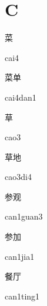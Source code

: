 ﻿%
\section*{C}
\begin{multicols*}{2}

\begin{verbete}[cai4]{菜}
\begin{pronuncia}{cai4}
\end{pronuncia}
\end{verbete}

\begin{verbete}{菜单}
\begin{pronuncia}{cai4dan1}
\end{pronuncia}
\end{verbete}

\begin{verbete}[cao3]{草}
\begin{pronuncia}{cao3}
\end{pronuncia}
\end{verbete}

\begin{verbete}[cao3di4]{草地}
\begin{pronuncia}{cao3di4}
\end{pronuncia}
\end{verbete}

\begin{verbete}{参观}
\begin{pronuncia}{can1guan3}
\end{pronuncia}
\end{verbete}

\begin{verbete}{参加}
\begin{pronuncia}{can1jia1}
\end{pronuncia}
\end{verbete}

\begin{verbete}{餐厅}
\begin{pronuncia}{can1ting1}
\end{pronuncia}
\end{verbete}


\end{multicols*}
